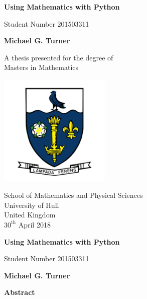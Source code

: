 \documentclass[12pt,twoside]{report}   %
\begin{document}
\begin{titlepage}
    \begin{center}
        \vspace*{1cm}
        
        \Huge
        \textbf{Using Mathematics with Python}
        
        \vspace{0.5cm}
        \LARGE
        Student Number 201503311
        
        \vspace{1.5cm}
        
        \textbf{Michael G. Turner}
        
        \vfill
        
        A thesis presented for the degree of\\
        Masters in Mathematics
        
        \vspace{0.8cm}
        
        \includegraphics[width=0.4\textwidth]{HullShield.pdf}
        
        \Large
        School of Mathematics and Physical Sciences\\
        University of Hull\\
        United Kingdom\\
        $30^{\text{th}}$ April 2018
        
    \end{center}
\end{titlepage}

\thispagestyle{plain}
\begin{center}
    \Large
    \textbf{Using Mathematics with Python}
    
    \vspace{0.4cm}
    \large
    Student Number 201503311
    
    \vspace{0.4cm}
    \textbf{Michael G. Turner}
    
    \vspace{0.9cm}
    \textbf{Abstract}
\end{center}
\end{document}
